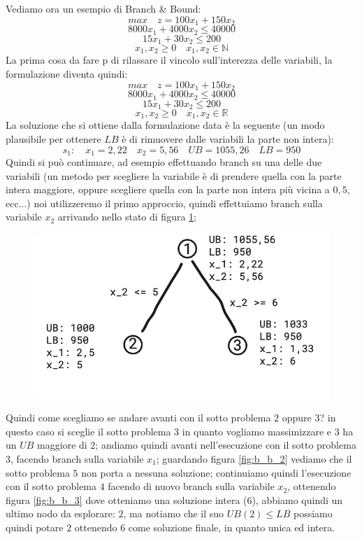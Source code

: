 \documentclass[12pt,a4paper]{article}
\begin{document}
Vediamo ora un esempio di Branch \& Bound:
$$ max \quad z = 100 x_1 + 150 x_2 $$
$$ 8000 x_1 + 4000 x_2 \leq 40000 $$
$$ 15 x_1 + 30 x_2 \leq 200 $$
$$ x_1, x_2 \geq 0 \quad x_1, x_2 \in \mathbb{N} $$
La prima cosa da fare p di rilassare il vincolo sull'interezza delle variabili, la formulazione diventa quindi:
$$ max \quad z = 100 x_1 + 150 x_2 $$
$$ 8000 x_1 + 4000 x_2 \leq 40000 $$
$$ 15 x_1 + 30 x_2 \leq 200 $$
$$ x_1, x_2 \geq 0 \quad x_1, x_2 \in \mathbb{R} $$
La soluzione che si ottiene dalla formulazione data è la seguente (un modo plausibile per ottenere $LB$ è di rimuovere dalle variabili la parte non intera):
$$ s_1: \quad x_1 = 2,22 \quad x_2 = 5,56 \quad UB = 1055,26 \quad LB = 950$$
Quindi si può continuare, ad esempio effettuando branch su una delle due variabili (un metodo per scegliere la variabile è di prendere quella con la parte intera maggiore, oppure scegliere quella con la parte non intera più vicina a $0,5$, ecc...) noi utilizzeremo il primo approccio, quindi effettuiamo branch sulla variabile $x_2$ arrivando nello stato di figura \ref{fig:b_b_1};
\begin{figure}[h]
	\centering
	\includegraphics[width=0.8\linewidth]{img/b_b_1}
	\caption{}
	\label{fig:b_b_1}
\end{figure}
Quindi come scegliamo se andare avanti con il sotto problema $2$ oppure $3$? in questo caso si sceglie il sotto problema $3$ in quanto vogliamo massimizzare e $3$ ha un $UB$ maggiore di $2$; andiamo quindi avanti nell'esecuzione con il sotto problema $3$, facendo branch sulla variabile $x_1$; guardando figura \ref{fig:b_b_2} vediamo che il sotto problema $5$ non porta a nessuna soluzione; continuiamo quindi l'esecuzione con il sotto problema $4$ facendo di nuovo branch sulla variabile $x_2$, ottenendo figura \ref{fig:b_b_3} dove otteniamo una soluzione intera ($6$), abbiamo quindi un ultimo nodo da esplorare: $2$, ma notiamo che il suo $UB(2) \leq LB$ possiamo quindi potare $2$ ottenendo $6$ come soluzione finale, in quanto unica ed intera.
\end{document}

